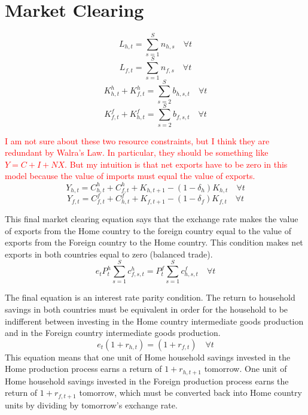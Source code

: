 \section{Market Clearing}\label{SecLgOpenMC}

  \begin{equation}\label{EqLgOpenMC_Lh}
    L_{h,t} = \sum_{s=1}^S n_{h,s} \quad\forall t
  \end{equation}
  \begin{equation}\label{EqLgOpenMC_Lf}
    L_{f,t} = \sum_{s=1}^S n_{f,s} \quad\forall t
  \end{equation}
  \begin{equation}\label{EqLgOpenMC_Kh}
    K^h_{h,t} + K^h_{f,t} = \sum_{s=2}^S b_{h,s,t} \quad\forall t
  \end{equation}
  \begin{equation}\label{EqLgOpenMC_Kf}
    K^f_{f,t} + K^f_{h,t} = \sum_{s=2}^S b_{f,s,t} \quad\forall t
  \end{equation}

  \textcolor{red}{I am not sure about these two resource constraints, but I think they are redundant by Walra's Law. In particular, they should be something like $Y = C + I + NX$. But my intuition is that net exports have to be zero in this model because the value of imports must equal the value of exports.}
  \begin{equation}\label{EqLgOpenMC_Yh}
    Y_{h,t} = C^h_{h,t} + C^h_{f,t} + K_{h,t+1} - (1 - \delta_h)K_{h,t} \quad\forall t
  \end{equation}
  \begin{equation}\label{EqLgOpenMC_Yf}
    Y_{f,t} = C^f_{f,t} + C^f_{h,t} + K_{f,t+1} - (1 - \delta_f)K_{f,t} \quad\forall t
  \end{equation}

  This final market clearing equation says that the exchange rate makes the value of exports from the Home country to the foreign country equal to the value of exports from the Foreign country to the Home country. This condition makes net exports in both countries equal to zero (balanced trade).
  \begin{equation}\label{EqLgOpenMC_et}
    e_t P^h_t\sum_{s=1}^S c^h_{f,s,t} = P^f_t\sum_{s=1}^S c^f_{h,s,t} \quad\forall t
  \end{equation}

  The final equation is an interest rate parity condition. The return to household savings in both countries must be equivalent in order for the household to be indifferent between investing in the Home country intermediate goods production and in the Foreign country intermediate goods production.
  \begin{equation}\label{EqLgOpenMC_rt}
    e_t(1 + r_{h,t}) = (1 + r_{f,t}) \quad\forall t
  \end{equation}
  This equation means that one unit of Home household savings invested in the Home production process earns a return of $1 + r_{h,t+1}$ tomorrow. One unit of Home household savings invested in the Foreign production process earns the return of $1 + r_{f,t+1}$ tomorrow, which must be converted back into Home country units by dividing by tomorrow's exchange rate.


